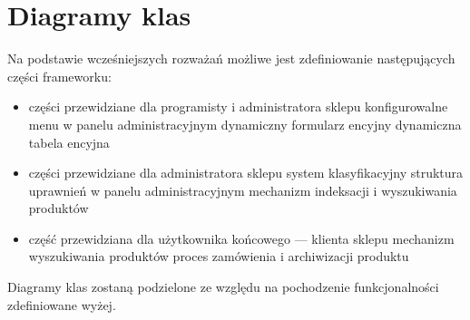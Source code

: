 \newpage
\section{Diagramy klas}

Na podstawie wcześniejszych rozważań możliwe jest zdefiniowanie następujących części frameworku: 
\begin{itemize}
	\item części przewidziane dla programisty i administratora sklepu
	\subitem konfigurowalne menu w panelu administracyjnym
	\subitem dynamiczny formularz encyjny
	\subitem dynamiczna tabela encyjna
	\item części przewidziane dla administratora sklepu
	\subitem system klasyfikacyjny
	\subitem struktura uprawnień w panelu administracyjnym
	\subitem mechanizm indeksacji i wyszukiwania produktów
	\item część przewidziana dla użytkownika końcowego — klienta sklepu
	\subitem mechanizm wyszukiwania produktów
	\subitem proces zamówienia i archiwizacji produktu
\end{itemize}
Diagramy klas zostaną podzielone ze względu na pochodzenie funkcjonalności zdefiniowane wyżej. 



